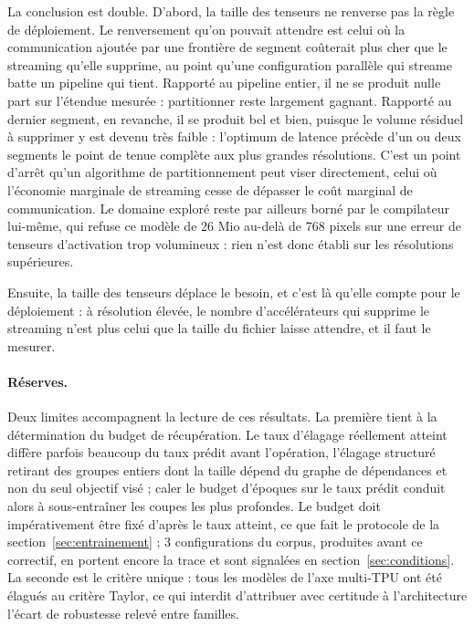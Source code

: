 \documentclass[11pt,a4paper]{report}
\begin{document}
La conclusion est double. D'abord, la taille des tenseurs ne renverse pas la règle de déploiement. Le renversement qu'on pouvait attendre est celui où la communication ajoutée par une frontière de segment coûterait plus cher que le streaming qu'elle supprime, au point qu'une configuration parallèle qui streame batte un pipeline qui tient. Rapporté au pipeline entier, il ne se produit nulle part sur l'étendue mesurée : partitionner reste largement gagnant. Rapporté au dernier segment, en revanche, il se produit bel et bien, puisque le volume résiduel à supprimer y est devenu très faible : l'optimum de latence précède d'un ou deux segments le point de tenue complète aux plus grandes résolutions. C'est un point d'arrêt qu'un algorithme de partitionnement peut viser directement, celui où l'économie marginale de streaming cesse de dépasser le coût marginal de communication. Le domaine exploré reste par ailleurs borné par le compilateur lui-même, qui refuse ce modèle de 26 Mio au-delà de 768 pixels sur une erreur de tenseurs d'activation trop volumineux : rien n'est donc établi sur les résolutions supérieures.

Ensuite, la taille des tenseurs déplace le besoin, et c'est là qu'elle compte pour le déploiement : à résolution élevée, le nombre d'accélérateurs qui supprime le streaming n'est plus celui que la taille du fichier laisse attendre, et il faut le mesurer.

\paragraph{Réserves.} Deux limites accompagnent la lecture de ces résultats. La première tient à la détermination du budget de récupération. Le taux d'élagage réellement atteint diffère parfois beaucoup du taux prédit avant l'opération, l'élagage structuré retirant des groupes entiers dont la taille dépend du graphe de dépendances et non du seul objectif visé ; caler le budget d'époques sur le taux prédit conduit alors à sous-entraîner les coupes les plus profondes. Le budget doit impérativement être fixé d'après le taux atteint, ce que fait le protocole de la section~\ref{sec:entrainement} ; 3 configurations du corpus, produites avant ce correctif, en portent encore la trace et sont signalées en section~\ref{sec:conditions}. La seconde est le critère unique : tous les modèles de l'axe multi-TPU ont été élagués au critère Taylor, ce qui interdit d'attribuer avec certitude à l'architecture l'écart de robustesse relevé entre familles.
\end{document}
